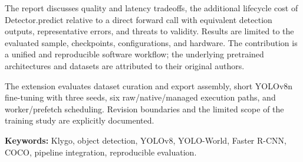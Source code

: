 The report discusses quality and latency tradeoffs, the additional lifecycle cost of Detector.predict relative to a direct forward call with equivalent detection outputs, representative errors, and threats to validity. Results are limited to the evaluated sample, checkpoints, configurations, and hardware. The contribution is a unified and reproducible software workflow; the underlying pretrained architectures and datasets are attributed to their original authors.

The extension evaluates dataset curation and export assembly, short YOLOv8n fine-tuning with three seeds, six raw/native/managed execution paths, and worker/prefetch scheduling. Revision boundaries and the limited scope of the training study are explicitly documented.

\textbf{Keywords:} Klygo, object detection, YOLOv8, YOLO-World, Faster R-CNN, COCO, pipeline integration, reproducible evaluation.
\clearpage
